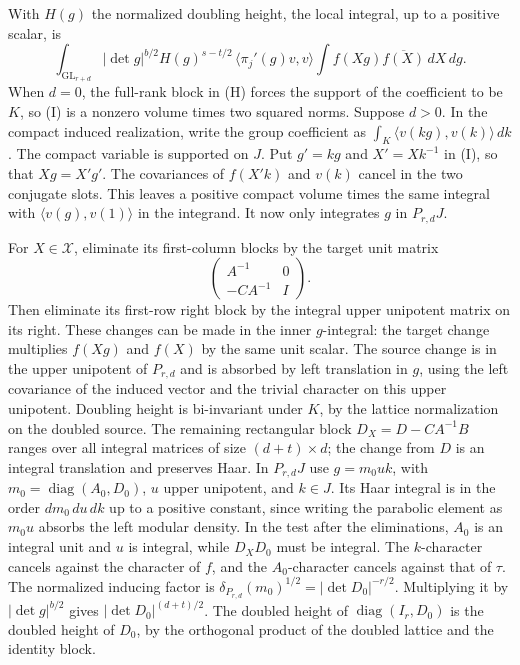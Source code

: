 With \(H(g)\) the normalized doubling height, the local
integral, up to a positive scalar, is
\[
 \int_{\mathrm{GL}_{r+d}}
    |\det g|^{b/2}H(g)^{s-t/2}\,
          \langle\pi_j'(g)v,v\rangle
       \int f(Xg)\overline{f(X)}\,dX\,dg .
 \tag{I}
\]
When \(d=0\), the full-rank block in (H) forces the
support of the coefficient to be \(K\), so (I) is a
nonzero volume times two squared norms. Suppose \(d>0\).
In the compact induced realization, write the group
coefficient as
\(\int_K\langle v(kg),v(k)\rangle\,dk\).
The compact variable is supported on \(J\). Put
\(g'=kg\) and \(X'=Xk^{-1}\) in (I), so that
\(Xg=X'g'\). The covariances of \(f(X'k)\)
and \(v(k)\) cancel in the two conjugate slots.
This leaves a positive compact volume
times the same integral with
\(\langle v(g),v(1)\rangle\) in the integrand. It now
only integrates \(g\) in \(P_{r,d}J\).

For \(X\in\mathscr X\), eliminate its first-column
blocks by the target unit matrix
\[
 \begin{pmatrix} A^{-1}&0\\-CA^{-1}&I\end{pmatrix}.
\]
Then eliminate its first-row right block by the
integral upper unipotent matrix on its right. These
changes can be made in the inner \(g\)-integral: the
target change multiplies \(f(Xg)\) and \(f(X)\)
by the same unit scalar. The source change is in
the upper unipotent of \(P_{r,d}\) and is absorbed by
left translation in \(g\), using the left covariance
of the induced vector and the trivial character on
this upper unipotent. Doubling height is bi-invariant
under \(K\), by the lattice normalization on the
doubled source. The remaining rectangular block
\(D_X=D-CA^{-1}B\) ranges over all integral matrices
of size \((d+t)\times d\); the change from \(D\)
is an integral translation and preserves Haar.
In \(P_{r,d}J\) use \(g=m_0u k\), with
\(m_0=\operatorname{diag}(A_0,D_0)\), \(u\) upper
unipotent, and \(k\in J\). Its Haar integral is in
the order \(dm_0\,du\,dk\) up to a positive constant,
since writing the parabolic element as \(m_0u\)
absorbs the left modular density. In the test after
the eliminations, \(A_0\) is an integral unit and
\(u\) is integral, while \(D_XD_0\) must be integral.
The \(k\)-character cancels against the character
of \(f\), and the \(A_0\)-character cancels against
that of \(\tau\). The normalized inducing factor
is \(\delta_{P_{r,d}}(m_0)^{1/2}=|\det D_0|^{-r/2}\).
Multiplying it by \(|\det g|^{b/2}\) gives
\(|\det D_0|^{(d+t)/2}\). The doubled height of
\(\operatorname{diag}(I_r,D_0)\) is the doubled
height of \(D_0\), by the orthogonal product of
the doubled lattice and the identity block.


